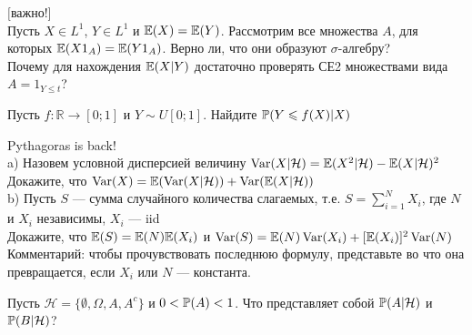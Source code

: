 \begin{problem}
 $[$важно!$]$ \\
 Пусть $X\in L^{1}$, $Y\in L^{1}$ и $\E(X)=\E(Y)$.
Рассмотрим все множества $A$, для которых $\E(X 1_{A})=\E(Y 1_{A})$.
Верно ли, что
они образуют $\sigma$-алгебру? \\
Почему для нахождения $\E(X|Y)$ достаточно проверять СЕ2
множествами вида $A=1_{Y\le t}$?

\begin{sol}

\end{sol}
\end{problem}

\begin{problem}
Пусть $f:\mathbb{R}\rightarrow [0;1]$ и $Y\sim
U[0;1]$. Найдите $\P(Y\le f(X)|X)$

\begin{sol}

\end{sol}
\end{problem}

\begin{problem}
 Pythagoras is back! \\
a) Назовем условной дисперсией величину
$\Var(X|\mathcal{H})=\E(X^{2}|\mathcal{H})-\E(X|\mathcal{H})^{2}$ \\
Докажите, что
$\Var(X)=\E(\Var(X|\mathcal{H}))+\Var(\E(X|\mathcal{H}))$ \\
b) Пусть $S$ — сумма случайного количества слагаемых, т.е.
$S=\sum_{i=1}^{N}X_{i}$, где $N$ и $X_{i}$ независимы, $X_{i}$ — iid \\
Докажите, что $\E(S)=\E(N)\E(X_{i})$ и
$\Var(S)=\E(N)\Var(X_{i})+[\E(X_{i})]^{2}\Var(N)$ \\
Комментарий: чтобы прочувствовать последнюю формулу, представьте
во что она превращается, если $X_{i}$ или $N$ — константа.

\begin{sol}

\end{sol}
\end{problem}

\begin{problem}
Пусть $\mathcal{H}=\{\emptyset,\Omega,A,A^{c}\}$ и $0<\P(A)<1$. Что
представляет собой $\P(A|\mathcal{H})$ и $\P(B|\mathcal{H})$?

\begin{sol}

\end{sol}
\end{problem}

